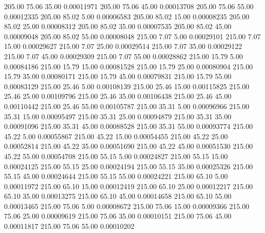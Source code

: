     205.00     75.06     35.00     0.00011971
    205.00     75.06     45.00     0.00013708
    205.00     75.06     55.00     0.00012335
    205.00     85.02      5.00     0.00006583
    205.00     85.02     15.00     0.00008235
    205.00     85.02     25.00     0.00008312
    205.00     85.02     35.00     0.00007535
    205.00     85.02     45.00     0.00009048
    205.00     85.02     55.00     0.00008048
    215.00      7.07      5.00     0.00029101
    215.00      7.07     15.00     0.00029627
    215.00      7.07     25.00     0.00029514
    215.00      7.07     35.00     0.00029122
    215.00      7.07     45.00     0.00029309
    215.00      7.07     55.00     0.00028862
    215.00     15.79      5.00     0.00084186
    215.00     15.79     15.00     0.00081528
    215.00     15.79     25.00     0.00080904
    215.00     15.79     35.00     0.00080171
    215.00     15.79     45.00     0.00079831
    215.00     15.79     55.00     0.00083129
    215.00     25.46      5.00     0.00108139
    215.00     25.46     15.00     0.00115825
    215.00     25.46     25.00     0.00109796
    215.00     25.46     35.00     0.00106438
    215.00     25.46     45.00     0.00110442
    215.00     25.46     55.00     0.00105787
    215.00     35.31      5.00     0.00096966
    215.00     35.31     15.00     0.00095497
    215.00     35.31     25.00     0.00094879
    215.00     35.31     35.00     0.00091096
    215.00     35.31     45.00     0.00088528
    215.00     35.31     55.00     0.00093774
    215.00     45.22      5.00     0.00055867
    215.00     45.22     15.00     0.00054455
    215.00     45.22     25.00     0.00052814
    215.00     45.22     35.00     0.00051690
    215.00     45.22     45.00     0.00051530
    215.00     45.22     55.00     0.00054708
    215.00     55.15      5.00     0.00024827
    215.00     55.15     15.00     0.00024125
    215.00     55.15     25.00     0.00024194
    215.00     55.15     35.00     0.00025326
    215.00     55.15     45.00     0.00024644
    215.00     55.15     55.00     0.00024221
    215.00     65.10      5.00     0.00011972
    215.00     65.10     15.00     0.00012419
    215.00     65.10     25.00     0.00012217
    215.00     65.10     35.00     0.00013275
    215.00     65.10     45.00     0.00014658
    215.00     65.10     55.00     0.00013465
    215.00     75.06      5.00     0.00008672
    215.00     75.06     15.00     0.00009366
    215.00     75.06     25.00     0.00009619
    215.00     75.06     35.00     0.00010151
    215.00     75.06     45.00     0.00011817
    215.00     75.06     55.00     0.00010202
